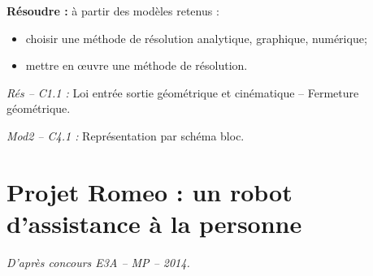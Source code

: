 \documentclass[10pt]{article}
\newif\ifprof
\begin{document}






\begin{comp}
\noindent \textbf{Résoudre :} à partir des modèles retenus :
\begin{itemize}
\item choisir une méthode de résolution analytique, graphique, numérique;
\item mettre en \oe{}uvre une méthode de résolution.
\end{itemize}

\noindent \textit{Rés -- C1.1 :} Loi entrée sortie géométrique et cinématique -- Fermeture géométrique.

\noindent \textit{Mod2 -- C4.1 :} Représentation par schéma bloc.
\end{comp}

\section*{Projet Romeo : un robot d'assistance à la personne}

\begin{flushright}
\textit{D'après concours E3A -- MP -- 2014.}
\end{flushright}

\ifprof
\else
\end{document}
